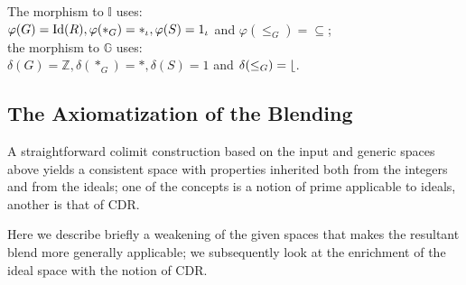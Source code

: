 The morphism to $\mathbb{I}$  uses:\\
$\varphi(G)={\rm Id}(R),\varphi(*_G)=*_{\iota},
\varphi(S)=1_{\iota}$ and $\varphi(\leq_G)=\subseteq$;\\
the morphism to $\mathbb{G}$ uses:\\ $\delta(G)=\mathbb{Z}, \delta(*_G)=*,
\delta(S)=1$ and $\delta(\leq_G)= \lfloor$.


\subsection{The Axiomatization of the Blending}

A straightforward colimit construction based on the input and generic
spaces above yields a consistent space with properties inherited both
from the integers and from the ideals; one of the concepts is a notion
of prime applicable to ideals, another is that of CDR.

Here we describe briefly a weakening of the given spaces
that makes the resultant blend more generally applicable;
we subsequently look at the enrichment of the ideal space
with the notion of CDR.

%
%
 
